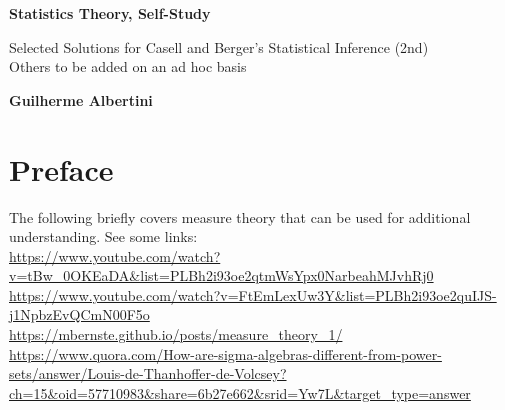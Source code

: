 \documentclass[titlepage]{book}
\begin{document}
\begin{titlepage}
    \begin{center}
        \vspace*{1cm}

        \Huge
        \textbf{Statistics Theory, Self-Study}

        \vspace{0.5cm}
        \LARGE
        Selected Solutions for Casell and Berger's Statistical Inference (2nd)\\
        Others to be added on an ad hoc basis\\
        \vspace{1.5cm}

        \textbf{Guilherme Albertini}

        \vfill

        \vspace{0.8cm}

        \Large

    \end{center}
\end{titlepage}

\frontmatter
\tableofcontents

\chapter*{Preface}

The following briefly covers measure theory that can be used for additional
understanding. See some links:\\

\url{https://www.youtube.com/watch?v=tBw_0OKEaDA&list=PLBh2i93oe2qtmWsYpx0NarbeahMJvhRj0}\\
\url{https://www.youtube.com/watch?v=FtEmLexUw3Y&list=PLBh2i93oe2quIJS-j1NpbzEvQCmN00F5o}\\
\url{https://mbernste.github.io/posts/measure_theory_1/}\\
\url{https://www.quora.com/How-are-sigma-algebras-different-from-power-sets/answer/Louis-de-Thanhoffer-de-Volcsey?ch=15&oid=57710983&share=6b27e662&srid=Yw7L&target_type=answer}\\
\end{document}
